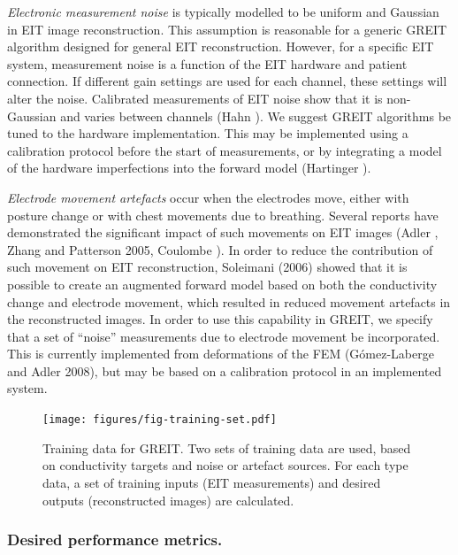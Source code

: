 \documentclass[12pt]{iopart}
\begin{document}
{\em Electronic measurement noise}
is typically modelled to be uniform and Gaussian in EIT
image reconstruction. This assumption is reasonable for
a generic GREIT algorithm designed for general EIT reconstruction.
However, for a specific EIT system, measurement noise
is a function of the EIT hardware and patient
connection. If different gain settings are used for each
channel, these settings will alter the noise. Calibrated
measurements of EIT noise show that it is non-Gaussian and
varies between channels (Hahn ).
 We suggest GREIT algorithms
be tuned to the hardware implementation. This may be 
implemented using a calibration protocol before the 
start of measurements, or by integrating a model of 
the hardware imperfections into the forward model
(Hartinger ).

{\em Electrode movement artefacts}
occur when the electrodes move, either with posture change
or with chest movements due to breathing. Several reports
have demonstrated the significant impact of such movements on
EIT images (Adler , Zhang and Patterson 2005,
Coulombe ). In order to reduce the contribution
of such movement on EIT reconstruction, Soleimani \etal
(2006) showed that it is possible to create an
augmented forward model based on both the conductivity change
and electrode movement, which resulted in reduced movement 
artefacts in the reconstructed images. In order
to use this capability in GREIT, we specify that a
set of ``noise'' measurements due to electrode movement 
be incorporated. This is currently implemented from
deformations of the FEM (G\'omez-Laberge and Adler 2008),
but may be based on a calibration protocol in an
implemented system.

\begin{figure}[bhtp]
\begin{center}
\texttt{[image: figures/fig-training-set.pdf]}
\caption{ \label{fig:desired_performance}
Training data for GREIT. Two sets of training data are used, based on
conductivity targets and noise or artefact sources. For each type
data, a set of training inputs (EIT measurements) and desired
outputs (reconstructed images) are calculated.
}
\end{center}
\end{figure}

 
\subsubsection{Desired performance metrics.}
\end{document}
